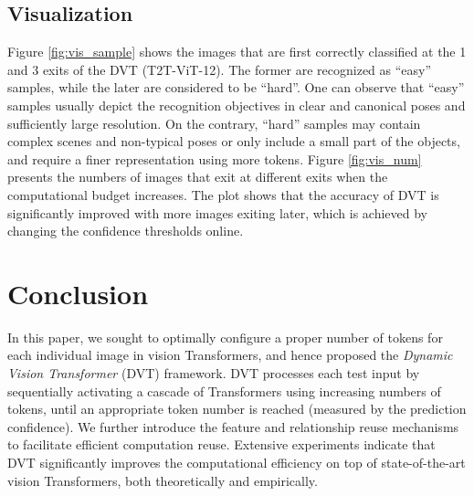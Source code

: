 \documentclass{article}
\begin{document}
\vspace{-1.5ex}
\subsection{Visualization}
\vspace{-1.5ex}
Figure \ref{fig:vis_sample} shows the images that are first correctly classified at the 1 and 3 exits of the DVT (T2T-ViT-12). The former are recognized as ``easy'' samples, while the later are considered to be ``hard''. One can observe that ``easy'' samples usually depict the recognition objectives in clear and canonical poses and sufficiently large resolution. On the contrary, ``hard'' samples may contain complex scenes and non-typical poses or only include a small part of the objects, and require a finer representation using more tokens. Figure \ref{fig:vis_num} presents the numbers of images that exit at different exits when the computational budget increases. The plot shows that the accuracy of DVT is significantly improved with more images exiting later, which is achieved by changing the confidence thresholds online.


 



\vspace{-2ex}
\section{Conclusion}
\vspace{-2ex}

In this paper, we sought to optimally configure a proper number of tokens for each individual image in vision Transformers, and hence proposed the \emph{Dynamic Vision Transformer} (DVT) framework. DVT processes each test input by sequentially activating a cascade of Transformers using increasing numbers of tokens, until an appropriate token number is reached (measured by the prediction confidence). We further introduce the feature and relationship reuse mechanisms to facilitate efficient computation reuse. Extensive experiments indicate that DVT significantly improves the computational efficiency on top of state-of-the-art vision Transformers, both theoretically and empirically. 
\end{document}
